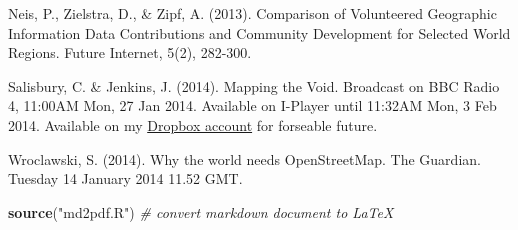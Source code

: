 \documentclass[]{article}
\newenvironment{Shaded}{}{}
\newcommand{\KeywordTok}[1]{\textcolor[rgb]{0.00,0.44,0.13}{\textbf{{#1}}}}
\newcommand{\StringTok}[1]{\textcolor[rgb]{0.25,0.44,0.63}{{#1}}}
\newcommand{\CommentTok}[1]{\textcolor[rgb]{0.38,0.63,0.69}{\textit{{#1}}}}
\newcommand{\NormalTok}[1]{{#1}}
\begin{document}
Neis, P., Zielstra, D., \& Zipf, A. (2013). Comparison of Volunteered
Geographic Information Data Contributions and Community Development for
Selected World Regions. Future Internet, 5(2), 282-300.

Salisbury, C. \& Jenkins, J. (2014). Mapping the Void. Broadcast on BBC
Radio 4, 11:00AM Mon, 27 Jan 2014. Available on I-Player until 11:32AM
Mon, 3 Feb 2014. Available on my
\href{https://dl.dropboxusercontent.com/u/15008199/egs2stay/Mapping\_the\_Void\_-\_Mapping\_the\_Void\_b03s6mf0\_default.m4a}{Dropbox
account} for forseable future.

Wroclawski, S. (2014). Why the world needs OpenStreetMap. The Guardian.
Tuesday 14 January 2014 11.52 GMT.

\begin{Shaded}
\begin{Highlighting}[]
\KeywordTok{source}\NormalTok{(}\StringTok{"md2pdf.R"}\NormalTok{)  }\CommentTok{# convert markdown document to LaTeX}
\end{Highlighting}
\end{Shaded}
\end{document}
